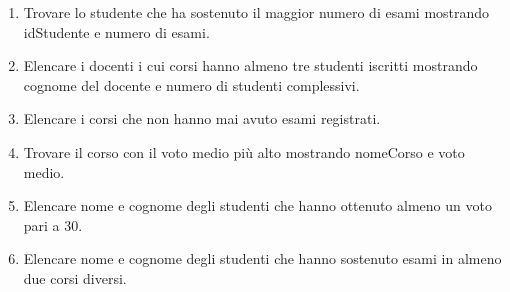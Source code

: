 \documentclass[a4paper,12pt]{article}
\begin{document}
\begin{enumerate}
	\item Trovare lo studente che ha sostenuto il maggior numero di esami mostrando idStudente e numero di esami.
	
	\item Elencare i docenti i cui corsi hanno almeno tre studenti iscritti mostrando cognome del docente e numero di studenti complessivi.
	
	\item Elencare i corsi che non hanno mai avuto esami registrati.
	
	\item Trovare il corso con il voto medio più alto mostrando nomeCorso e voto medio.
	
	\item Elencare nome e cognome degli studenti che hanno ottenuto almeno un voto pari a 30.
	
	\item Elencare nome e cognome degli studenti che hanno sostenuto esami in almeno due corsi diversi.
	
\end{enumerate}
\end{document}
